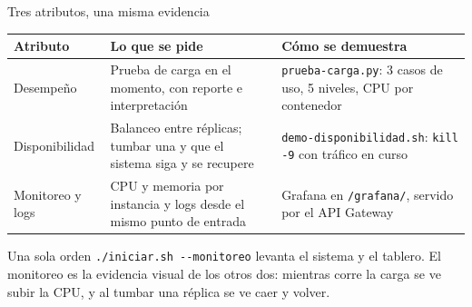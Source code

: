 
\begin{frame}{Tres atributos, una misma evidencia}
\small
\begin{tabular}{L{2.4cm}L{5.2cm}L{5.5cm}}
\toprule
\textbf{Atributo} & \textbf{Lo que se pide} & \textbf{Cómo se demuestra}\\
\midrule
Desempeño & Prueba de carga en el momento, con reporte e interpretación &
\texttt{prueba-carga.py}: 3 casos de uso, 5 niveles, CPU por contenedor\\[0.3em]
Disponibilidad & Balanceo entre réplicas; tumbar una y que el sistema siga y se recupere &
\texttt{demo-disponibilidad.sh}: \texttt{kill -9} con tráfico en curso\\[0.3em]
Monitoreo y logs & CPU y memoria por instancia y logs desde el mismo punto de entrada &
Grafana en \texttt{/grafana/}, servido por el API Gateway\\
\bottomrule
\end{tabular}

\vspace{0.8em}
\begin{block}{Una sola orden}
\texttt{./iniciar.sh -{}-monitoreo} levanta el sistema y el tablero. El monitoreo es la evidencia
visual de los otros dos: mientras corre la carga se ve subir la CPU, y al tumbar una réplica se ve
caer y volver.
\end{block}
\end{frame}

